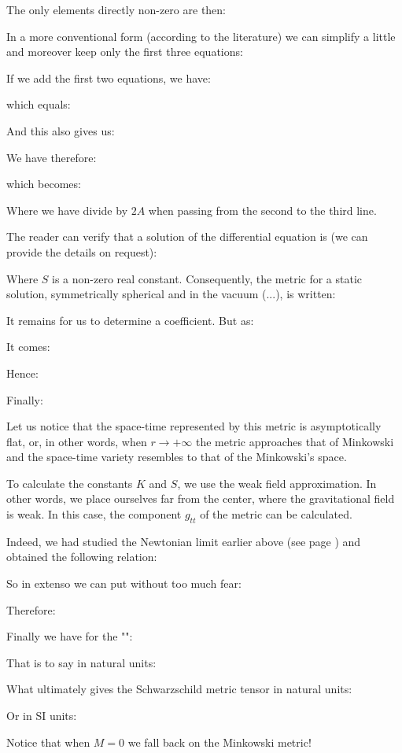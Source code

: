 	The only elements directly non-zero are then:
	
	In a more conventional form (according to the literature) we can simplify a little and moreover keep only the first three equations:
	
	If we add the first two equations, we have:
	
	which equals:
	
	And this also gives us:
	
	We have therefore:
	
	which becomes:
	
	Where we have divide by $2A$ when passing from the second to the third line.

	The reader can verify that a solution of the differential equation is (we can provide the details on request):
	
	Where $S$ is a non-zero real constant. Consequently, the metric for a static solution, symmetrically spherical and in the vacuum (...), is written:
	
	It remains for us to determine a coefficient. But as:
	
	It comes:
	
	Hence:
	
	Finally:
	
	Let us notice that the space-time represented by this metric is asymptotically flat, or, in other words, when $r\rightarrow +\infty$ the metric approaches that of Minkowski and the space-time variety resembles to that of the Minkowski's space.

	To calculate the constants $K$ and $S$, we use the weak field approximation. In other words, we place ourselves far from the center, where the gravitational field is weak. In this case, the component $g_{tt}$ of the metric can be calculated.

	Indeed, we had studied the Newtonian limit earlier above (see page \pageref{newtonian limit}) and obtained the following relation:
	
	So in extenso we can put without too much fear:
	
	Therefore:
	
	Finally we have for the "":
	
	That is to say in natural units:
	
	What ultimately gives the Schwarzschild metric tensor in natural units:
	
	Or in SI units:
	
	Notice that when $M=0$ we fall back on the Minkowski metric!
	
